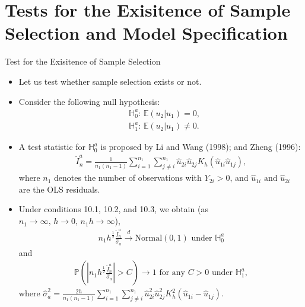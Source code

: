 \documentclass[xcolor=svgnames,dvipdfmx,cjk]{beamer}
\theoremstyle{example}
\def\E{\mathbb{E}}
\def\H{\mathbb{H}}
\def\P{\mathbb{P}}
\def\darrow{\xrightarrow{d}}
\begin{document}
\section{Tests for the Exisitence of Sample Selection and Model Specification}

\begin{frame}{Test for the Exisitence of Sample Selection}
      \begin{itemize}
            \item Let us test whether sample selection exists or not.
            \item Consider the following null hypothesis:
                  \begin{align*}
                        &\H_{0}^a: \, \E(u_2|u_1) = 0, \\
                        &\H_{1}^a: \, \E(u_2|u_1) \neq 0.
                  \end{align*}
            \item A test statistic for $\H_{0}^a$ is proposed 
                  by Li and Wang (1998); and Zheng (1996):
                  \begin{align*}
                        \tilde{I}_n^a 
                              = \frac{1}{n_1 (n_1 - 1)}
                                \sum_{i=1}^{n_1} \sum_{j \neq i}^{n_1}
                                \hat{u}_{2i} \hat{u}_{2j} K_h (\hat{u}_{1i} \hat{u}_{1j}),
                  \end{align*}
                  where $n_1$ denotes the number of observations with $Y_{2i} > 0$, and 
                  $\hat{u}_{1i} \text{ and } \hat{u}_{2i}$ are the OLS residuals.
      \end{itemize}
\end{frame}

\begin{frame}
      \begin{itemize}
            \item Under conditions 10.1, 10.2, and 10.3, we obtain 
                  (as $n_1 \to \infty, \, h \to 0,\, n_1 h \to \infty$),
                  \begin{align*}
                        n_1 h^{\frac{1}{2}}\frac{\tilde{I}_n^a}{\hat{\sigma}_a} \darrow \text{Normal} (0,1) \text{ under } \H_{0}^a
                  \end{align*}
                  and 
                  \begin{align*}
                        \P \left(
                              \left|
                                    n_1 h^{\frac{1}{2}}\frac{\tilde{I}_n^a}{\hat{\sigma}_a}  
                              \right| > C
                        \right) \to 1 \text{ for any } C>0 \text{ under } \H_{1}^a,
                  \end{align*}
                  where $\hat{\sigma}_a^2 
                              = \displaystyle\frac{2h}{n_1(n_1 - 1)}
                                \sum_{i=1}^{n_1} \sum_{j \neq i}^{n_1}
                                \hat{u}_{2i}^2 \hat{u}_{2j}^2 K_h^2 (\hat{u}_{1i} - \hat{u}_{1j})$.
      \end{itemize}
\end{frame}
\end{document}
